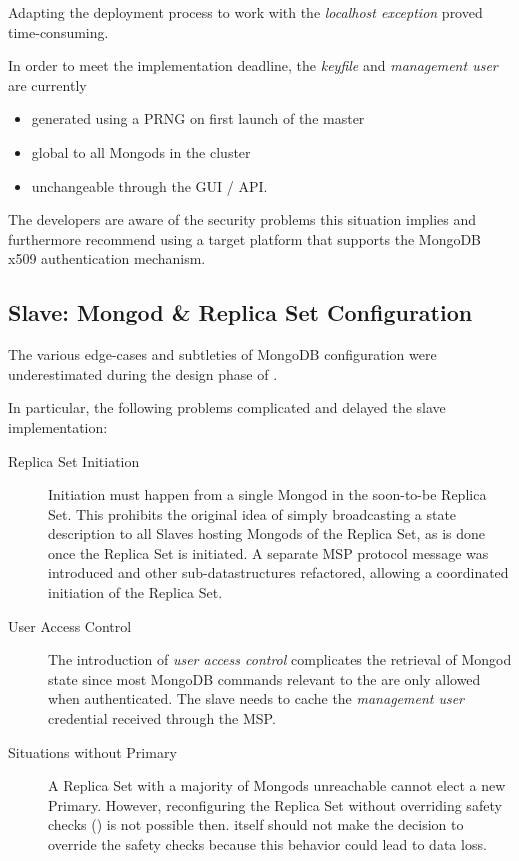 Adapting the deployment process to work with the \textit{localhost exception} proved time-consuming.

In order to meet the implementation deadline, the \textit{keyfile} and \textit{management user} are currently

\begin{itemize}
  \item generated using a PRNG on first launch of the master
  \item global to all Mongods in the cluster
  \item unchangeable through the GUI / API.
\end{itemize}

The developers are aware of the security problems this situation implies and furthermore recommend using a target platform that supports
the MongoDB x509 authentication mechanism. %

\subsection{Slave: Mongod \& Replica Set Configuration}\label{di:replsetconfig}

The various edge-cases and subtleties of MongoDB configuration were underestimated during the design phase of \mamid.

In particular, the following problems complicated and delayed the slave implementation:
\begin{description}
\item[Replica Set Initiation] Initiation must happen from a single Mongod in the soon-to-be Replica Set.
     This prohibits the original idea of simply broadcasting a state description to all Slaves hosting Mongods of the Replica Set,
        as is done once the Replica Set is initiated.
     A separate MSP protocol message  was introduced and other sub-datastructures refactored, allowing
        a coordinated initiation of the Replica Set.
\item[User Access Control] The introduction of \textit{user access control} complicates the retrieval of Mongod state since most MongoDB
        commands relevant to the  are only allowed when authenticated.
        The slave needs to cache the \textit{management user} credential received through the MSP.
\item[Situations without Primary] A Replica Set with a majority of Mongods unreachable cannot elect a new Primary.
        However, reconfiguring the Replica Set without overriding safety checks () is not possible then.
        \mamid itself should not make the decision to override the safety checks because this behavior could lead to data loss.
\end{description}


